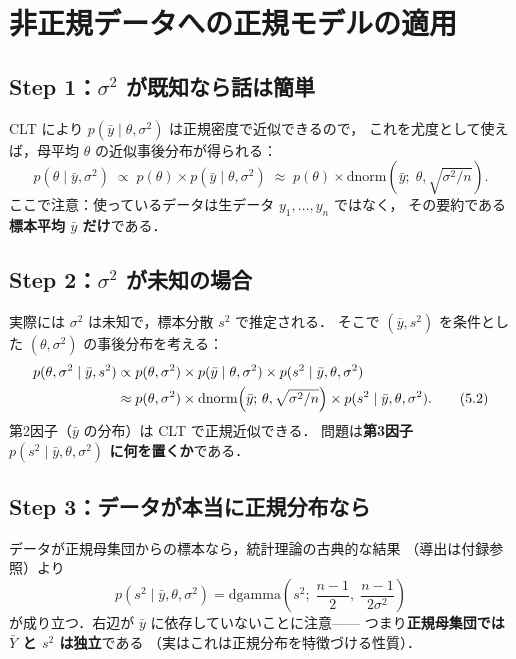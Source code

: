 \documentclass[lualatex,ja=standard,a4paper,12pt]{bxjsarticle}
\begin{document}
\section{非正規データへの正規モデルの適用}

\subsection*{Step 1：$\sigma^2$ が既知なら話は簡単}

CLT により $p(\bar{y} \mid \theta, \sigma^2)$ は正規密度で近似できるので，
これを尤度として使えば，母平均 $\theta$ の近似事後分布が得られる：
\[
  p(\theta \mid \bar{y}, \sigma^2)
  \;\propto\; p(\theta) \times p(\bar{y} \mid \theta, \sigma^2)
  \;\approx\; p(\theta) \times
    \mathrm{dnorm}\!\left(\bar{y};\; \theta, \sqrt{\sigma^2/n}\right).
\]
ここで注意：使っているデータは生データ $y_1, \ldots, y_n$ ではなく，
その要約である\textbf{標本平均 $\bar{y}$ だけ}である．

\subsection*{Step 2：$\sigma^2$ が未知の場合}

実際には $\sigma^2$ は未知で，標本分散 $s^2$ で推定される．
そこで $(\bar{y}, s^2)$ を条件とした $(\theta, \sigma^2)$ の事後分布を考える：
\begin{align}
  p(\theta, \sigma^2 \mid \bar{y}, s^2)
  &\propto p(\theta, \sigma^2)
    \times p(\bar{y} \mid \theta, \sigma^2)
    \times p(s^2 \mid \bar{y}, \theta, \sigma^2) \notag\\
  &\approx p(\theta, \sigma^2)
    \times \mathrm{dnorm}\!\left(\bar{y};\, \theta, \sqrt{\sigma^2/n}\right)
    \times p(s^2 \mid \bar{y}, \theta, \sigma^2). \tag{5.2}
\end{align}
第2因子（$\bar{y}$ の分布）は CLT で正規近似できる．
問題は\textbf{第3因子 $p(s^2 \mid \bar{y}, \theta, \sigma^2)$ に何を置くか}である．

\subsection*{Step 3：データが本当に正規分布なら}

データが正規母集団からの標本なら，統計理論の古典的な結果
（導出は付録参照）より
\[
  p(s^2 \mid \bar{y}, \theta, \sigma^2)
  = \mathrm{dgamma}\!\left(s^2;\;\frac{n-1}{2},\;\frac{n-1}{2\sigma^2}\right)
\]
が成り立つ．右辺が $\bar{y}$ に依存していないことに注意——
つまり\textbf{正規母集団では $\bar{Y}$ と $s^2$ は独立}である
（実はこれは正規分布を特徴づける性質）．
\end{document}

